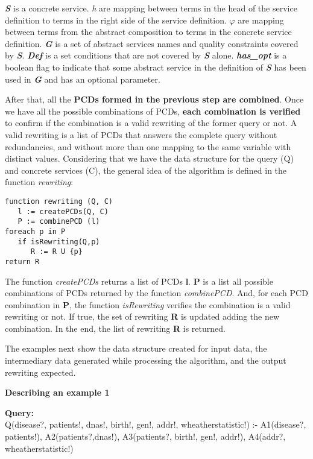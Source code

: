 \documentclass[12pt,a4paper,oneside]{report}
\begin{document}
\textbf{\textit{S}} is a concrete service. \textit{h} are mapping between terms in the head of the service definition to terms in the right side of the service definition. \textbf{\textit{$\varphi$}} are mapping between terms from the abstract composition to terms in the concrete service definition. \textbf{\textit{G}} is a set of abstract services names and quality constraints covered by \textbf{\textit{S}}. \textbf{\textit{Def}} is a set conditions that are not covered by \textbf{\textit{S}} alone.\textbf{ \textit{has\_opt}} is a boolean flag to indicate that some abstract service in the definition of \textbf{\textit{S}} has been used in \textbf{\textit{G}} and has an optional parameter.

After that, all the \textbf{PCDs formed in the previous step are combined}. Once we have all the possible combinations of PCDs, \textbf{each combination is verified} to confirm if the combination is a valid rewriting of the former query or not.
A valid rewriting is a list of PCDs that answers the complete query without redundancies, and without more than one mapping to the same variable with distinct values.
\bigskip
Considering that we have the data structure for the query (Q) and concrete services (C), the general idea of the algorithm is defined in the function \emph{rewriting}:

\begin{verbatim}
function rewriting (Q, C)
   l := createPCDs(Q, C)
   P := combinePCD (l)
foreach p in P
   if isRewriting(Q,p)
      R := R U {p}
return R
\end{verbatim}

The function \emph{createPCDs} returns a list of PCDs \textbf{l}. \textbf{P} is a list all possible combinations of PCDs returned by the function \emph{combinePCD}. And, for each PCD combination in \textbf{P}, the function \emph{isRewriting} verifies the combination is a valid rewriting or not. If true, the set of rewriting \textbf{R} is updated adding the new combination. In the end, the list of rewriting \textbf{R} is returned.

\bigskip The examples next show the data structure created for input data, the intermediary data generated while processing the algorithm, and the output rewriting expected.
 
\begin{flushleft}
\textbf{Describing an example 1}
\end{flushleft}

\begin{flushleft}
\textbf{Query:} \\
Q(disease?, patients!, dnas!, birth!, gen!, addr!, wheatherstatistic!) :- A1(disease?, patients!), A2(patients?,dnas!), A3(patients?, birth!, gen!, addr!), A4(addr?, wheatherstatistic!) \\
\end{flushleft}
\end{document}

